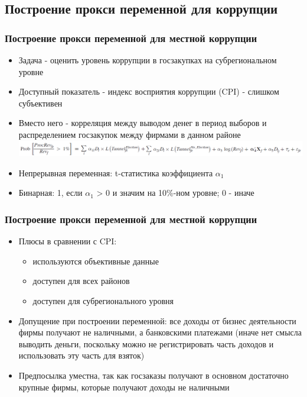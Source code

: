 \subsection{Построение прокси переменной для коррупции}

\begin{frame}
\frametitle{Построение прокси переменной для местной коррупции}
	\begin{itemize}
		\item Задача - оценить уровень коррупции в госзакупках на субрегиональном уровне
		\item Доступный показатель - индекс восприятия коррупции (CPI) - слишком субъективен
		\item Вместо него - корреляция между выводом денег в период выборов и распределением госзакупок
		 между фирмами в данном районе
		\includegraphics[scale=0.3]{images/kek1}
		\item Непрерывная переменная: t-статистика коэффициента $\alpha_1$
		\item Бинарная: 1, если $\alpha_1$ > 0 и значим на 10\%-ном уровне; 0 - иначе
	\end{itemize}
\end{frame}


\begin{frame}
\frametitle{Построение прокси переменной для местной коррупции}
	\begin{itemize}
		\item Плюсы в сравнении с CPI: 
		\begin{itemize}
			\item используются объективные данные
			\item доступен для всех районов
			\item доступен для субрегионального уровня
		\end{itemize} 
		\item Допущение при построении переменной: все доходы от бизнес деятельности фирмы получают не наличными, а банковскими платежами (иначе нет смысла выводить деньги, поскольку можно не регистрировать часть доходов и использовать эту часть для взяток)
		\item Предпосылка уместна, так как госзаказы получают в основном достаточно крупные фирмы, которые получают доходы не наличными 
	\end{itemize}
\end{frame}


